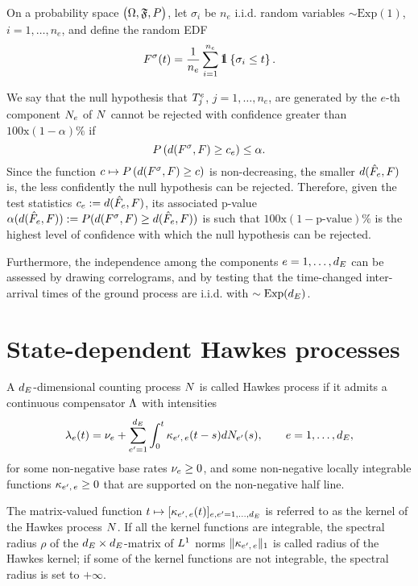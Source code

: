 \documentclass[10pt, article,table]{article}
\begin{document}
On a probability space $\probabilitySpace$, let $\sigma_i$ be $n_e$ i.i.d. random variables $\sim \text{Exp}(1)$, $i=1,\dots, n_e$, and define the random EDF 
\begin{equation*}
 F^{\sigma}(t) = \frac{1}{n_e}\sum_{i=1}^{n_e} \one \left\lbrace \sigma_i \leq t\right\rbrace.
\end{equation*}

We say that the null hypothesis that $\arrivalTimes_{j}$, $j=1, \dots, n_e$, are generated by the $e$-th component $\countingProc$ of $\multiCountingProc$ cannot be rejected with confidence greater than $100\text{x}(1-\alpha)\text{\%}$ if 
\begin{equation*}
 \Prob\left( d(F^\sigma, F) \geq c_e \right) \leq \alpha.
\end{equation*}
Since the function $c \mapsto \Prob\left( d(F^\sigma, F) \geq c \right)$ is non-decreasing, the smaller $d(\EDFfun, F)$ is, the less confidently the null hypothesis can be rejected. Therefore, given the test statistics $c_e:=d(\EDFfun, F)$, its associated p-value $\alpha(d(\EDFfun,F)) := \Prob(d(F^\sigma, F) \geq d(\EDFfun,F))$ is such that $100\text{x}(1-\text{p-value})\text{\%}$ is the highest level of confidence with which the null hypothesis can be rejected.

Furthermore, the independence among the components $e=1,\dots, \numEventTypes$ can be assessed by drawing correlograms, and by testing that the time-changed inter-arrival times of the ground process are i.i.d. with $\sim \text{Exp}(\numEventTypes)$.

\section{State-dependent Hawkes processes}
A $\numEventTypes$-dimensional counting process $\multiCountingProc$ is called Hawkes process if it admits a continuous compensator $\compensator$ with intensities 
\begin{equation}\label{eq.intensity_ordHawkes}
 \intensity(t) = \baseRate_e + \sum_{\eone=1}^{\numEventTypes}\intzerot \hawkesKernel\subscriptee(t-s)d\countingProc[\eone](s), \qquad e=1,\dots,\numEventTypes,
\end{equation}
for some non-negative base rates $\baseRate_e \geq 0$, and some non-negative locally integrable functions $\hawkesKernel\subscriptee \geq 0$ that are supported on the non-negative half line.

The matrix-valued function $t\mapsto [\hawkesKernel\subscriptee(t)]_{e,\eone = 1, \dots, \numEventTypes}$ is referred to as the kernel of the Hawkes process $\multiCountingProc$.  If all the kernel functions are integrable, the spectral radius $\rho$ of the $\numEventTypes\times\numEventTypes$-matrix of $\Lone$ norms $\Vert \hawkesKernel\subscriptee \Vert_{1}$ is called radius of the Hawkes kernel; if some of the kernel functions are not integrable, the spectral radius is set to $+\infty$.  
\end{document}
